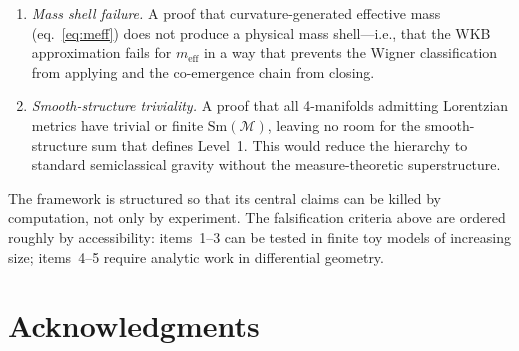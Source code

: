 \documentclass[12pt,a4paper]{article}
\theoremstyle{definition}
\theoremstyle{remark}
\begin{document}
\begin{enumerate}
\item \emph{Mass shell failure.} A proof that curvature-generated
effective mass (eq.~\eqref{eq:meff}) does not produce a physical mass
shell---i.e., that the WKB approximation fails for $m_{\mathrm{eff}}$
in a way that prevents the Wigner classification from applying and the
co-emergence chain from closing.

\item \emph{Smooth-structure triviality.} A proof that all 4-manifolds
admitting Lorentzian metrics have trivial or finite
$\mathrm{Sm}(\mathcal{M})$, leaving no room for the smooth-structure
sum that defines Level~1. This would reduce the hierarchy to standard
semiclassical gravity without the measure-theoretic superstructure.
\end{enumerate}
The framework is structured so that its central claims can be killed by
computation, not only by experiment. The falsification criteria above
are ordered roughly by accessibility: items~1--3 can be tested in
finite toy models of increasing size; items~4--5 require analytic work
in differential geometry.

\section*{Acknowledgments}

\end{document}
